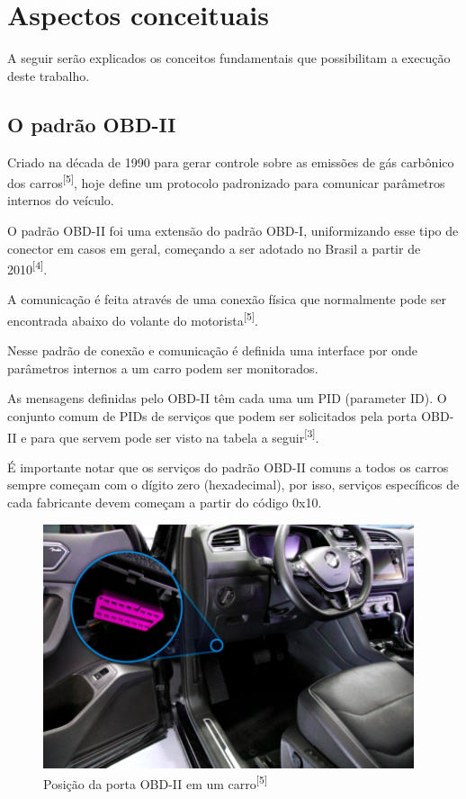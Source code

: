 \chapter{Aspectos conceituais}
\label{CAP2}

A seguir serão explicados os conceitos fundamentais que possibilitam a execução deste trabalho. 


\section{O padrão OBD-II}

Criado na década de 1990 para gerar controle sobre as emissões de gás carbônico dos carros\textsuperscript{[5]}, hoje define um protocolo padronizado para comunicar parâmetros internos do veículo.
    
O padrão OBD-II foi uma extensão do padrão OBD-I, uniformizando esse tipo de conector em casos em geral, começando a ser adotado no Brasil a partir de 2010\textsuperscript{[4]}.

A comunicação é feita através de uma conexão física que normalmente pode ser encontrada abaixo do volante do motorista\textsuperscript{[5]}.

Nesse padrão de conexão e comunicação é definida uma interface por onde parâmetros internos a um carro podem ser monitorados.

As mensagens definidas pelo OBD-II têm cada uma um PID (parameter ID). O conjunto comum de PIDs de serviços que podem ser solicitados pela porta OBD-II e para que servem pode ser visto na tabela a seguir\textsuperscript{[3]}.



É importante notar que os serviços do padrão OBD-II comuns a todos os carros sempre começam com o dígito zero (hexadecimal), por isso, serviços específicos de cada fabricante devem começam a partir do código 0x10.

\begin{figure}[hp]
    \centering
    
    \includegraphics[]{figures/localizacao_obd2.png}
    
    \caption{Posição da porta OBD-II em um carro\textsuperscript{[5]}}
\end{figure}

